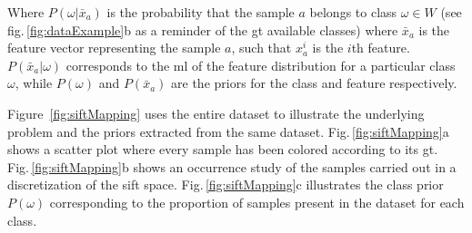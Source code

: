 \documentclass[a4paper, 10pt, conference]{llncs}      %
\begin{document}
Where $P(\omega|\bar{x}_a)$ is the probability that the sample $a$ belongs to class $\omega \in W$ (see fig.\,\ref{fig:dataExample}b as a reminder of the \ac{gt} available classes) where $\bar{x}_a$ is the feature vector representing the sample $a$, such that $x_a^i$ is the $i$th feature. $P(\bar{x}_a|\omega)$ corresponds to the \ac{ml} of the feature distribution for a particular class $\omega$, while $P(\omega)$ and $P(\bar{x}_a)$ are the priors for the class and feature respectively.

Figure~\ref{fig:siftMapping} uses the entire dataset to illustrate the underlying problem and the priors extracted from the same dataset. Fig.\,\ref{fig:siftMapping}a shows a scatter plot where every sample has been colored according to its \ac{gt}. Fig.\,\ref{fig:siftMapping}b shows an occurrence study of the samples carried out in a discretization of the \ac{sift} space. Fig.\,\ref{fig:siftMapping}c illustrates the class prior $P(\omega)$ corresponding to the proportion of samples present in the dataset for each class.
\end{document}
